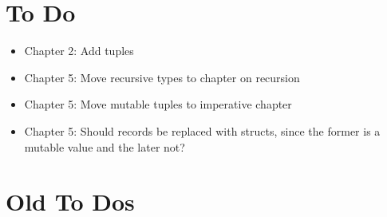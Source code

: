 \documentclass[fsharpNotes.tex]{subfiles}
\begin{document}
\chapter{To Do}
\begin{itemize}
\item Chapter 2: Add tuples
\item Chapter 5: Move recursive types to chapter on recursion
\item Chapter 5: Move mutable tuples to imperative chapter
\item Chapter 5: Should records be replaced with structs, since the former is a mutable value and the later not?
\end{itemize}
\chapter{Old To Dos}
\end{document}
